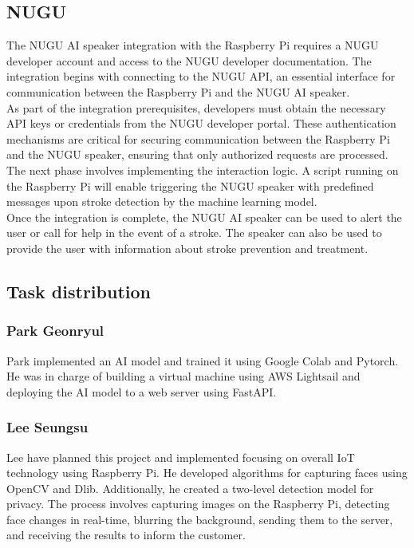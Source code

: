 \subsection{\textbf{NUGU}}

The NUGU AI speaker integration with the Raspberry Pi requires a NUGU developer account and access to the NUGU developer documentation. The integration begins with connecting to the NUGU API, an essential interface for communication between the Raspberry Pi and the NUGU AI speaker.
\\

As part of the integration prerequisites, developers must obtain the necessary API keys or credentials from the NUGU developer portal. These authentication mechanisms are critical for securing communication between the Raspberry Pi and the NUGU speaker, ensuring that only authorized requests are processed. The next phase involves implementing the interaction logic. A script running on the Raspberry Pi will enable triggering the NUGU speaker with predefined messages upon stroke detection by the machine learning model.
\\

Once the integration is complete, the NUGU AI speaker can be used to alert the user or call for help in the event of a stroke. The speaker can also be used to provide the user with information about stroke prevention and treatment.

\subsection{\textbf{Task distribution}}
\subsubsection{\textbf{Park Geonryul}}
Park implemented an AI model and trained it using Google Colab and Pytorch. He was in charge of building a virtual machine using AWS Lightsail and deploying the AI model to a web server using FastAPI.\\

\subsubsection{\textbf{Lee Seungsu}}
Lee have planned this project and implemented focusing on overall IoT technology using Raspberry Pi. He developed algorithms for capturing faces using OpenCV and Dlib. Additionally, he created a two-level detection model for privacy. The process involves capturing images on the Raspberry Pi, detecting face changes in real-time, blurring the background, sending them to the server, and receiving the results to inform the customer.\\
